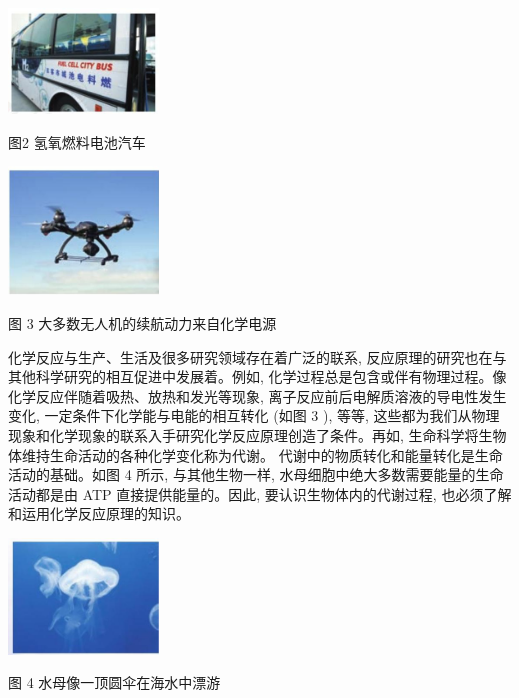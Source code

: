 \documentclass[10pt]{article}
\begin{document}
\begin{center}
\includegraphics[max width=0.3\textwidth]{images/0190da9d-8bfd-732f-bc2c-0b21d0f13b91_6_823274.jpg}
\end{center}

图2 氢氧燃料电池汽车

\begin{center}
\includegraphics[max width=0.3\textwidth]{images/0190da9d-8bfd-732f-bc2c-0b21d0f13b91_7_932175.jpg}
\end{center}

图 3 大多数无人机的续航动力来自化学电源

化学反应与生产、生活及很多研究领域存在着广泛的联系, 反应原理的研究也在与其他科学研究的相互促进中发展着。例如, 化学过程总是包含或伴有物理过程。像化学反应伴随着吸热、放热和发光等现象, 离子反应前后电解质溶液的导电性发生变化, 一定条件下化学能与电能的相互转化 (如图 3 ), 等等, 这些都为我们从物理现象和化学现象的联系入手研究化学反应原理创造了条件。再如, 生命科学将生物体维持生命活动的各种化学变化称为代谢。 代谢中的物质转化和能量转化是生命活动的基础。如图 4 所示, 与其他生物一样, 水母细胞中绝大多数需要能量的生命活动都是由 ATP 直接提供能量的。因此, 要认识生物体内的代谢过程, 也必须了解和运用化学反应原理的知识。

\begin{center}
\includegraphics[max width=0.3\textwidth]{images/0190da9d-8bfd-732f-bc2c-0b21d0f13b91_7_338581.jpg}
\end{center}

图 4 水母像一顶圆伞在海水中漂游
\end{document}
